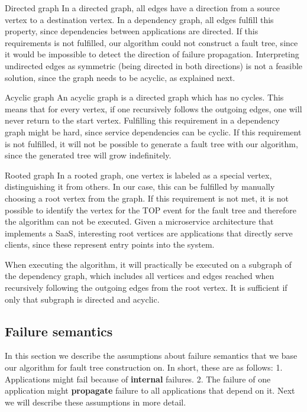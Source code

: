 \begin{tdescription}
  \item[Directed graph] In a directed graph, all edges have a direction from a source vertex to a destination vertex. In a dependency graph, all edges fulfill this property, since dependencies between applications are directed. If this requirements is not fulfilled, our algorithm could not construct a fault tree, since it would be impossible to detect the direction of failure propagation. Interpreting undirected edges as symmetric (being directed in both directions) is not a feasible solution, since the graph needs to be acyclic, as explained next.
  \item[Acyclic graph] An acyclic graph is a directed graph which has no cycles. This means that for every vertex, if one recursively follows the outgoing edges, one will never return to the start vertex. Fulfilling this requirement in a dependency graph might be hard, since service dependencies can be cyclic. If this requirement is not fulfilled, it will not be possible to generate a fault tree with our algorithm, since the generated tree will grow indefinitely.
    \item[Rooted graph] In a rooted graph, one vertex is labeled as a special vertex, distinguishing it from others. In our case, this can be fulfilled by manually choosing a root vertex from the graph. If this requirement is not met, it is not possible to identify the vertex for the TOP event for the fault tree and therefore the algorithm can not be executed. Given a microservice architecture that implements a SaaS, interesting root vertices are applications that directly serve clients, since these represent entry points into the system.
\end{tdescription}

When executing the algorithm, it will practically be executed on a subgraph of the dependency graph, which includes all vertices and edges reached when recursively following the outgoing edges from the root vertex. It is sufficient if only that subgraph is directed and acyclic.

\subsection{Failure semantics}
\label{s:failure_semantics}

In this section we describe the assumptions about failure semantics that we base our algorithm for fault tree construction on. In short, these are as follows: 1. Applications might fail because of \textbf{internal} failures. 2. The failure of one application might \textbf{propagate} failure to all applications that depend on it. Next we will describe these assumptions in more detail.

